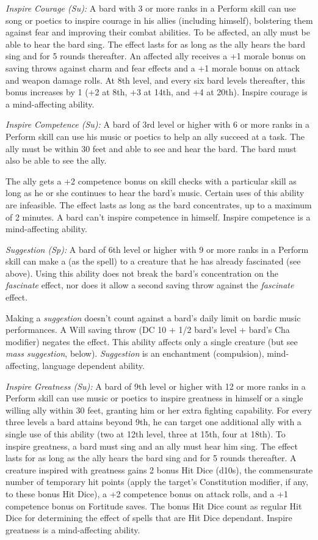 \textit{Inspire Courage (Su):} A bard with 3 or more ranks in a Perform skill can 
use song or poetics to inspire courage in his allies (including himself), bolstering 
them against fear and improving their combat abilities. To be affected, an ally 
must be able to hear the bard sing. The effect lasts for as long as the ally hears 
the bard sing and for 5 rounds thereafter. An affected ally receives a +1 morale 
bonus on saving throws against charm and fear effects and a +1 morale bonus on 
attack and weapon damage rolls. At 8th level, and every six bard levels thereafter, 
this bonus increases by 1 (+2 at 8th, +3 at 14th, and +4 at 20th). Inspire courage 
is a mind-affecting ability.

\textit{Inspire Competence (Su):} A bard of 3rd level or higher with 6 or more 
ranks in a Perform skill can use his music or poetics to help an ally succeed at 
a task. The ally must be within 30 feet and able to see and hear the bard. The 
bard must also be able to see the ally.

The ally gets a +2 competence bonus on skill checks with a particular skill as 
long as he or she continues to hear the bard's music. Certain uses of this ability 
are infeasible. The effect lasts as long as the bard concentrates, up to a maximum 
of 2 minutes. A bard can't inspire competence in himself. Inspire competence is 
a mind-affecting ability.

\textit{Suggestion (Sp):} A bard of 6th level or higher with 9 or more ranks in 
a Perform skill can make a  (as the spell) to a creature that 
he has already fascinated (see above). Using this ability does not break the bard's 
concentration on the \textit{fascinate} effect, nor does it allow a second saving 
throw against the \textit{fascinate} effect.

Making a \textit{suggestion} doesn't count against a bard's daily limit on bardic 
music performances. A Will saving throw (DC 10 + 1/2 bard's level + bard's Cha 
modifier) negates the effect. This ability affects only a single creature (but 
see \textit{mass suggestion}, below). \textit{Suggestion} is an enchantment (compulsion), 
mind-affecting, language dependent ability.

\textit{Inspire Greatness (Su):} A bard of 9th level or higher with 12 or more 
ranks in a Perform skill can use music or poetics to inspire greatness in himself 
or a single willing ally within 30 feet, granting him or her extra fighting capability. 
For every three levels a bard attains beyond 9th, he can target one additional 
ally with a single use of this ability (two at 12th level, three at 15th, four 
at 18th). To inspire greatness, a bard must sing and an ally must hear him sing. 
The effect lasts for as long as the ally hears the bard sing and for 5 rounds thereafter. 
A creature inspired with greatness gains 2 bonus Hit Dice (d10s), the commensurate 
number of temporary hit points (apply the target's Constitution modifier, if any, 
to these bonus Hit Dice), a +2 competence bonus on attack rolls, and a +1 competence 
bonus on Fortitude saves. The bonus Hit Dice count as regular Hit Dice for determining 
the effect of spells that are Hit Dice dependant. Inspire greatness is a mind-affecting 
ability.

